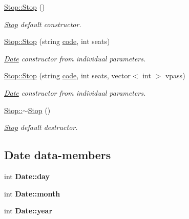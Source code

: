 \begin{DoxyCompactItemize}
\mbox{\label{group___date_gab8870f949c69cda03c4055524ed13c31}} 
\hyperlink{group___date_gab8870f949c69cda03c4055524ed13c31}{Stop\+::\+Stop} ()
\begin{DoxyCompactList}\small\item\em \hyperlink{class_stop}{Stop} default constructor. \end{DoxyCompactList}\item 
\hyperlink{group___date_gaa89c250884ae1407ac8647a8a3a58995}{Stop\+::\+Stop} (string \hyperlink{group___date_ga5a0dddd108225fd437be86eed7b3a3ef}{code}, int seats)
\begin{DoxyCompactList}\small\item\em \hyperlink{class_date}{Date} constructor from individual parameters. \end{DoxyCompactList}\item 
\hyperlink{group___date_ga843a7424de0129e7f6f066d2f8f1d1bc}{Stop\+::\+Stop} (string \hyperlink{group___date_ga5a0dddd108225fd437be86eed7b3a3ef}{code}, int seats, vector$<$ int $>$ vpass)
\begin{DoxyCompactList}\small\item\em \hyperlink{class_date}{Date} constructor from individual parameters. \end{DoxyCompactList}\item 
\mbox{\label{group___date_ga24e85edfa98a7a0212136679b6fad6d2}} 
\hyperlink{group___date_ga24e85edfa98a7a0212136679b6fad6d2}{Stop\+::$\sim$\+Stop} ()
\begin{DoxyCompactList}\small\item\em \hyperlink{class_stop}{Stop} default destructor. \end{DoxyCompactList}\end{DoxyCompactItemize}
\subsection*{Date data-\/members}
\begin{DoxyCompactItemize}
\item 
\mbox{\label{group___date_ga5b192adcabf2b2871e3f0b76c1ec1601}} 
int {\bfseries Date\+::day}
\item 
\mbox{\label{group___date_ga533843e07c6ac8d19fee9b16f5336ba2}} 
int {\bfseries Date\+::month}
\item 
\mbox{\label{group___date_ga3eeced2ed56bc95d56782b9e738db8ea}} 
int {\bfseries Date\+::year}
\end{DoxyCompactItemize}
